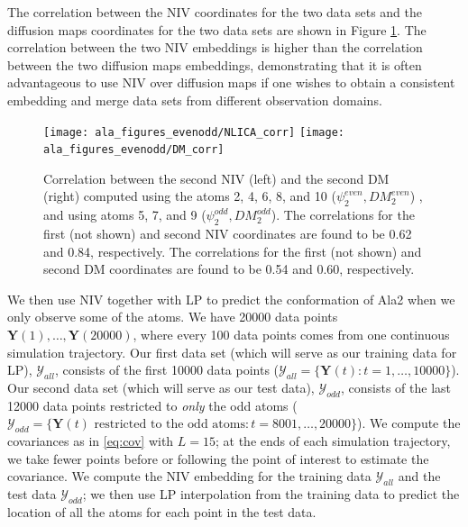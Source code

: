 \documentclass[aip,jcp,preprint]{revtex4-1}
\begin{document}
The correlation between the NIV coordinates for the two data sets and the diffusion maps coordinates for the two data sets are shown in Figure \ref{fig:ala_corr}.
%
The correlation between the two NIV embeddings is higher than the correlation between the two diffusion maps embeddings,
demonstrating that it is often advantageous to use NIV over diffusion maps if one wishes to obtain a consistent embedding and merge data sets from different observation domains.

\begin{figure}[ht]
    \texttt{[image: ala\_figures\_evenodd/NLICA\_corr]}
    \texttt{[image: ala\_figures\_evenodd/DM\_corr]}
    \caption{Correlation between the second NIV (left) and the second DM (right) computed using the atoms 2, 4, 6, 8, and 10 ($\psi_2^{even}, DM_2^{even}$) , and using atoms 5, 7, and 9 ($\psi_2^{odd}, DM_2^{odd}$).
    The correlations for the first (not shown) and second NIV coordinates are found to be 0.62 and 0.84, respectively.
    The correlations for the first (not shown) and second DM coordinates are found to be 0.54 and 0.60, respectively. }
    \label{fig:ala_corr}
\end{figure}


We then use NIV together with LP to predict the conformation of Ala2 when we only observe some of the atoms.
%
We have 20000 data points $\mathbf{Y}(1), \dots, \mathbf{Y}(20000)$, where every 100 data points comes from one continuous simulation trajectory.
%
Our first data set (which will serve as our training data for LP), $\mathcal{Y}_{all}$,
consists of the first 10000 data points ($\mathcal{Y}_{all} = \{\mathbf{Y}(t): t=1, \dots, 10000\}$).
%
Our second data set (which will serve as our test data), $\mathcal{Y}_{odd}$, consists of the last 12000 data points restricted to {\em only} the odd atoms
($\mathcal{Y}_{odd} = \{ \mathbf{Y}(t) \text{ restricted to the odd atoms}: t = 8001, \dots, 20000\}$).
%
We compute the covariances as in \eqref{eq:cov} with $L=15$;
at the ends of each simulation trajectory, we take fewer points before or following the point of interest to estimate the covariance.
%
We compute the NIV embedding for the training data $\mathcal{Y}_{all}$ and the test data $\mathcal{Y}_{odd}$; we then use LP interpolation from the training data to predict the location of all the atoms for each point in the test data.
\end{document}
